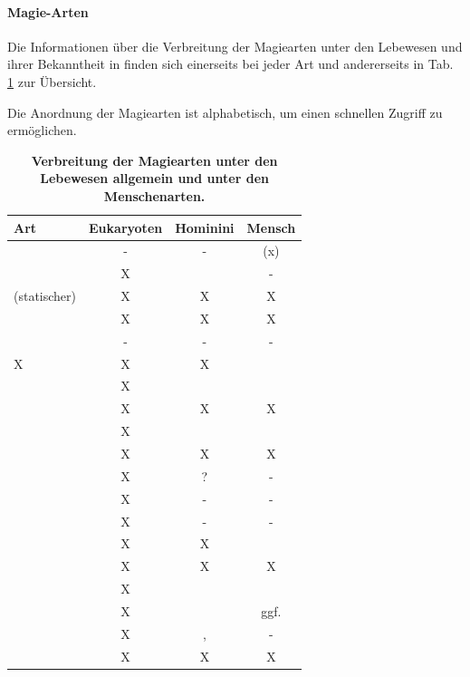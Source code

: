 \paragraph{Magie-Arten}
Die Informationen über die Verbreitung der Magiearten unter den Lebewesen und ihrer Bekanntheit in  finden sich einerseits bei jeder Art und andererseits in Tab. \ref{tab:magie-verbreitung} zur Übersicht.

Die Anordnung der Magiearten ist alphabetisch, um einen schnellen Zugriff zu ermöglichen.

\begin{table}[htb]
	\centering
	\caption{\textbf{Verbreitung der Magiearten unter den Lebewesen allgemein und unter den Menschenarten.}}
	\label{tab:magie-verbreitung}
	\begin{threeparttable}[\linewidth]
		\begin{tabularx}{\textwidth}{l|ccc}
			\toprule
			\textbf{Art} & \textbf{Eukaryoten} & \textbf{Hominini} & \textbf{Mensch} \\
		    \midrule
			\nameref{sec:nullmagie}  & - & - & (x)  \\
			\nameref{sec:bindungsmagie} & X & \nameref{rasse:sylvan} & -  \\
			(statischer) \nameref{sec:druckmagie} & X & X & X  \\
			\nameref{sec:gleichstrommagie}  & X & X & X  \\
			\nameref{sec:gravitationsmagie} & - & - & - \\ \midrule[0.1px]
			\nameref{sec:hydrodynamikmagie} X & X & X &\\
			\nameref{sec:infrarotmagie} & X & & \\
			\nameref{sec:lichtmagie}  & X & X & X  \\
			\nameref{sec:mikrowellenmagie} & X & &\\
			\nameref{sec:proliferationsmagie} & X & X & X \\ \midrule[0.1px]
			\nameref{sec:quantenmechanikmagie} & X & ? & - \\
			\nameref{sec:roentgenmagie} & X & - & - \\
			\nameref{sec:rundfunkmagie} & X & - & - \\
			\nameref{sec:schubmagie} & X & X & \\
			\nameref{sec:temperaturmagie} & X & X & X  \\ \midrule[0.1px]
			\nameref{sec:terahertzmagie} & X & & \\
			\nameref{sec:uvmagie} & X & \nameref{rasse:ferus} & ggf. \\
			\nameref{sec:vibrationsmagie} & X & \nameref{rasse:zwerg}, \nameref{rasse:unda} & -  \\
			\nameref{sec:wechselstrommagie} & X & X & X \\
			\bottomrule
		\end{tabularx}
	\end{threeparttable}
\end{table}



